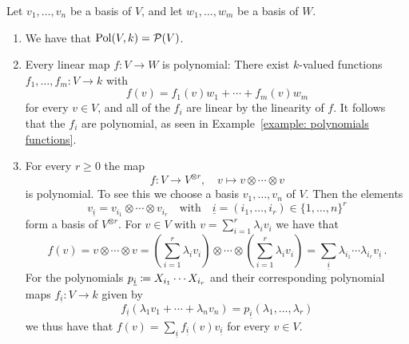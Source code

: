 \begin{example}
  \label{example: polynomial maps}
  Let $v_1, \dotsc, v_n$ be a basis of $V$, and let $w_1, \dotsc, w_m$ be a basis of $W$.
  \leavevmode
  \begin{enumerate}
    \item
      We have that $\operatorname{Pol}(V,k) = \mathcal{P}(V)$.
    \item
      Every linear map $f \colon V \to W$ is polynomial:
      There exist $k$-valued functions $f_1, \dotsc, f_m \colon V \to k$ with
      \[
          f(v)
        = f_1(v) w_1 + \dotsb + f_m(v) w_m
      \]
      for every $v \in V$, and all of the $f_i$ are linear by the linearity of $f$.
      It follows that the $f_i$ are polynomial, as seen in Example~\ref{example: polynomials functions}.
    \item
      For every $r \geq 0$ the map
      \[
                f
        \colon  V
        \to     V^{\otimes r},
        \quad   v
        \mapsto v \otimes \dotsb \otimes v
      \]
      is polynomial.
      To see this we choose a basis $v_1, \dotsc, v_n$ of $V$.
      Then the elements
      \[
          v_{\underline{i}}
        = v_{i_1} \otimes \dotsb \otimes v_{i_r}
        \quad\text{with}\quad
            \underline{i}
        =   (i_1, \dotsc, i_r)
        \in \{1, \dotsc, n\}^r
      \]
      form a basis of $V^{\otimes r}$.
      For $v \in V$ with $v = \sum_{i=1}^r \lambda_i v_i$ we have that
      \[
          f(v)
        = v \otimes \dotsb \otimes v
        =         \left( \sum_{i=1}^r \lambda_i v_i \right)
          \otimes \dotsb
          \otimes \left( \sum_{i=1}^r \lambda_i v_i \right)
        = \sum_{\underline{i}} \lambda_{i_1} \dotsm \lambda_{i_r} v_{\underline{i}} \,.
      \]
      For the polynomials $p_{\underline{i}} \coloneqq  X_{i_1} \dotsm X_{i_r}$ and their corresponding polynomial maps $f_{\underline{i}} \colon V \to k$ given by
      \[
          f_{\underline{i}}\left( \lambda_1 v_1 + \dotsb + \lambda_n v_n \right) = p_{\underline{i}}(\lambda_1, \dotsc, \lambda_r)
      \]
      we thus have that $f(v) = \sum_{\underline{i}} f_{\underline{i}}(v) v_{\underline{i}}$ for every $v \in V$.
  \end{enumerate}
\end{example}


